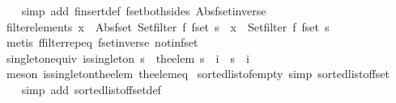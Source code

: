 \begin{isabellebody}
%
\isadelimproof
\ \ %
\endisadelimproof
%
\isatagproof
{}\isamarkupfalse%
\ {\isacharparenleft}simp\ add{\isacharcolon}\ finsert{\isacharunderscore}def\ fset{\isacharunderscore}both{\isacharunderscore}sides\ Abs{\isacharunderscore}fset{\isacharunderscore}inverse{\isacharparenright}%
\endisatagproof
{\isafoldproof}%
%
\isadelimproof
\isanewline
%
\endisadelimproof
\isanewline
{}\isamarkupfalse%
\ filter{\isacharunderscore}elements{\isacharcolon}\ {\isachardoublequoteopen}x\ {\isacharbar}{\isasymin}{\isacharbar}\ Abs{\isacharunderscore}fset\ {\isacharparenleft}Set{\isachardot}filter\ f\ {\isacharparenleft}fset\ s{\isacharparenright}{\isacharparenright}\ {\isacharequal}\ {\isacharparenleft}x\ {\isasymin}\ {\isacharparenleft}Set{\isachardot}filter\ f\ {\isacharparenleft}fset\ s{\isacharparenright}{\isacharparenright}{\isacharparenright}{\isachardoublequoteclose}\isanewline
%
\isadelimproof
\ \ %
\endisadelimproof
%
\isatagproof
{}\isamarkupfalse%
\ {\isacharparenleft}metis\ ffilter{\isachardot}rep{\isacharunderscore}eq\ fset{\isacharunderscore}inverse\ notin{\isacharunderscore}fset{\isacharparenright}%
\endisatagproof
{\isafoldproof}%
%
\isadelimproof
\isanewline
%
\endisadelimproof
\isanewline
{}\isamarkupfalse%
\ singleton{\isacharunderscore}equiv{\isacharcolon}\ {\isachardoublequoteopen}is{\isacharunderscore}singleton\ s\ {\isasymLongrightarrow}\ {\isacharparenleft}the{\isacharunderscore}elem\ s\ {\isacharequal}\ i{\isacharparenright}\ {\isacharequal}\ {\isacharparenleft}s\ {\isacharequal}\ {\isacharbraceleft}i{\isacharbraceright}{\isacharparenright}{\isachardoublequoteclose}\isanewline
%
\isadelimproof
\ \ %
\endisadelimproof
%
\isatagproof
{}\isamarkupfalse%
\ {\isacharparenleft}meson\ is{\isacharunderscore}singleton{\isacharunderscore}the{\isacharunderscore}elem\ the{\isacharunderscore}elem{\isacharunderscore}eq{\isacharparenright}%
\endisatagproof
{\isafoldproof}%
%
\isadelimproof
\isanewline
%
\endisadelimproof
\isanewline
{}\isamarkupfalse%
\ sorted{\isacharunderscore}list{\isacharunderscore}of{\isacharunderscore}empty\ {\isacharbrackleft}simp{\isacharbrackright}{\isacharcolon}\ {\isachardoublequoteopen}sorted{\isacharunderscore}list{\isacharunderscore}of{\isacharunderscore}fset\ {\isacharbraceleft}{\isacharbar}{\isacharbar}{\isacharbraceright}\ {\isacharequal}\ {\isacharbrackleft}{\isacharbrackright}{\isachardoublequoteclose}\isanewline
%
\isadelimproof
\ \ %
\endisadelimproof
%
\isatagproof
{}\isamarkupfalse%
\ {\isacharparenleft}simp\ add{\isacharcolon}\ sorted{\isacharunderscore}list{\isacharunderscore}of{\isacharunderscore}fset{\isacharunderscore}def{\isacharparenright}%

\end{isabellebody}
